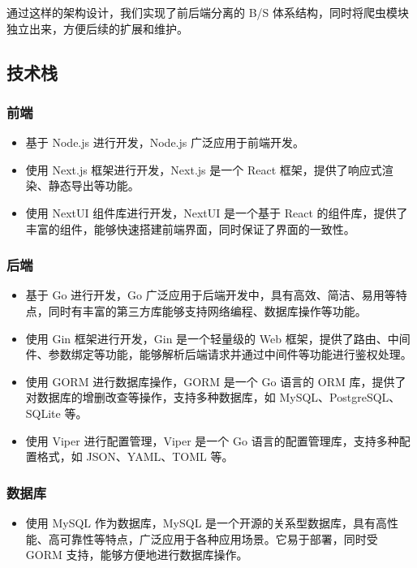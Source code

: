 通过这样的架构设计，我们实现了前后端分离的 B/S 体系结构，同时将爬虫模块独立出来，方便后续的扩展和维护。

\subsection{技术栈}

\subsubsection{前端}

\begin{itemize}
  \item 基于 Node.js 进行开发，Node.js 广泛应用于前端开发。
  \item 使用 Next.js 框架进行开发，Next.js 是一个 React 框架，提供了响应式渲染、静态导出等功能。
  \item 使用 NextUI 组件库进行开发，NextUI 是一个基于 React 的组件库，提供了丰富的组件，能够快速搭建前端界面，同时保证了界面的一致性。
\end{itemize}

\subsubsection{后端}

\begin{itemize}
  \item 基于 Go 进行开发，Go 广泛应用于后端开发中，具有高效、简洁、易用等特点，同时有丰富的第三方库能够支持网络编程、数据库操作等功能。
  \item 使用 Gin 框架进行开发，Gin 是一个轻量级的 Web 框架，提供了路由、中间件、参数绑定等功能，能够解析后端请求并通过中间件等功能进行鉴权处理。
  \item 使用 GORM 进行数据库操作，GORM 是一个 Go 语言的 ORM 库，提供了对数据库的增删改查等操作，支持多种数据库，如 MySQL、PostgreSQL、SQLite 等。
  \item 使用 Viper 进行配置管理，Viper 是一个 Go 语言的配置管理库，支持多种配置格式，如 JSON、YAML、TOML 等。
\end{itemize}

\subsubsection{数据库}

\begin{itemize}
  \item 使用 MySQL 作为数据库，MySQL 是一个开源的关系型数据库，具有高性能、高可靠性等特点，广泛应用于各种应用场景。它易于部署，同时受 GORM 支持，能够方便地进行数据库操作。
\end{itemize}

